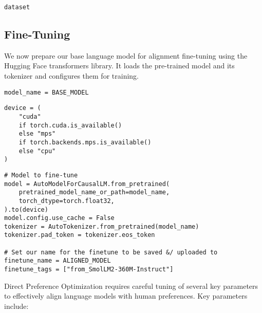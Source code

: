 \begin{verbatim}
dataset
\end{verbatim}


\subsection{Fine-Tuning}

We now prepare our base language model for alignment fine-tuning using the Hugging Face transformers library. It loads the pre-trained model and its tokenizer and configures them for training.

\begin{verbatim}
model_name = BASE_MODEL
\end{verbatim}

\begin{verbatim}
device = (
    "cuda"
    if torch.cuda.is_available()
    else "mps"
    if torch.backends.mps.is_available()
    else "cpu"
)
\end{verbatim}

\begin{verbatim}
# Model to fine-tune
model = AutoModelForCausalLM.from_pretrained(
    pretrained_model_name_or_path=model_name,
    torch_dtype=torch.float32,
).to(device)
model.config.use_cache = False
tokenizer = AutoTokenizer.from_pretrained(model_name)
tokenizer.pad_token = tokenizer.eos_token

# Set our name for the finetune to be saved &/ uploaded to
finetune_name = ALIGNED_MODEL
finetune_tags = ["from_SmolLM2-360M-Instruct"]
\end{verbatim}

Direct Preference Optimization requires careful tuning of several key parameters to effectively align language models with human preferences. Key parameters include:

